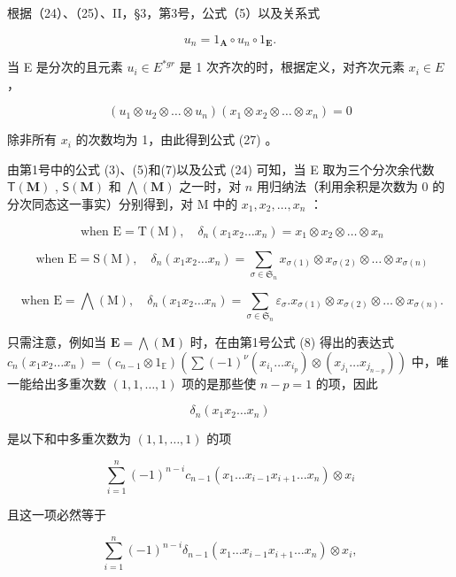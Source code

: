 根据（24）、（25）、II，§3，第3号，公式（5）以及关系式

\[
u _ {n} = 1 _ {\mathbf {A}} \circ u _ {n} \circ 1 _ {\mathbf {E}}.
\]

当 E 是分次的且元素 \(u_{i} \in E^{*gr}\) 是 1 次齐次的时，根据定义，对齐次元素 \(x_{i} \in E\) ，

\[
(u _ {1} \otimes u _ {2} \otimes \dots \otimes u _ {n}) (x _ {1} \otimes x _ {2} \otimes \dots \otimes x _ {n}) = 0
\]

除非所有 \(x_{i}\) 的次数均为 1，由此得到公式 (27) 。

由第1号中的公式 (3)、(5)和(7)以及公式 (24) 可知，当 E 取为三个分次余代数 \(\mathsf{T}(\mathbf{M})\) , \(\mathsf{S}(\mathbf{M})\) 和 \(\bigwedge (\mathbf{M})\) 之一时，对 \(n\) 用归纳法（利用余积是次数为 0 的分次同态这一事实）分别得到，对 M 中的 \(x_{1}, x_{2}, \ldots, x_{n}\) ：

\[
\text { when   } \mathrm{E} = \mathrm{T} (\mathrm{M}), \quad \delta_ {n} (x _ {1} x _ {2} \dots x _ {n}) = x _ {1} \otimes x _ {2} \otimes \dots \otimes x _ {n}
\]

\[
\text { when } \mathrm{E} = \mathrm{S(M)}, \quad \delta_ {n} (x _ {1} x _ {2} \dots x _ {n}) = \sum_ {\sigma \in \mathfrak {S} _ {n}} x _ {\sigma (1)} \otimes x _ {\sigma (2)} \otimes \dots \otimes x _ {\sigma (n)}
\]

\[
\text { when } \mathrm{E} = \bigwedge (\mathrm{M}), \quad \delta_ {n} (x _ {1} x _ {2} \dots x _ {n}) = \sum_ {\sigma \in \mathfrak {S} _ {n}} \varepsilon_ {\sigma}. x _ {\sigma (1)} \otimes x _ {\sigma (2)} \otimes \dots \otimes x _ {\sigma (n)}.
\]

只需注意，例如当 \(\mathbf{E} = \bigwedge (\mathbf{M})\) 时，在由第1号公式 (8) 得出的表达式 \(c_{n}(x_{1}x_{2}\ldots x_{n}) = (c_{n - 1}\otimes 1_{\mathbb{E}})\left(\sum (-1)^{\nu}(x_{i_1}\ldots x_{i_p})\otimes (x_{j_1}\ldots x_{j_{n - p}})\right)\) 中，唯一能给出多重次数 \((1,1,\dots ,1)\) 项的是那些使 \(n - p = 1\) 的项，因此

\[
\delta_ {n} (x _ {1} x _ {2} \dots x _ {n})
\]

是以下和中多重次数为 \((1, 1, \ldots, 1)\) 的项

\[
\sum_ {i = 1} ^ {n} (- 1) ^ {n - i} c _ {n - 1} \left(x _ {1} \dots x _ {i - 1} x _ {i + 1} \dots x _ {n}\right) \otimes x _ {i}
\]

且这一项必然等于

\[
\sum_ {i = 1} ^ {n} (- 1) ^ {n - i} \delta_ {n - 1} (x _ {1} \dots x _ {i - 1} x _ {i + 1} \dots x _ {n}) \otimes x _ {i},
\]

